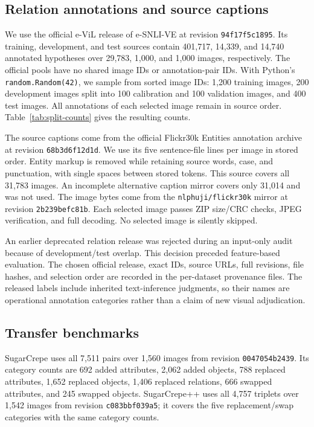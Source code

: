 \subsection{Relation annotations and source captions}
We use the official e-ViL release of e-SNLI-VE at revision \texttt{94f17f5c1895}. Its training, development, and test sources contain 401,717, 14,339, and 14,740 annotated hypotheses over 29,783, 1,000, and 1,000 images, respectively. The official pools have no shared image IDs or annotation-pair IDs. With Python's \texttt{random.Random(42)}, we sample from sorted image IDs: 1,200 training images, 200 development images split into 100 calibration and 100 validation images, and 400 test images. All annotations of each selected image remain in source order. Table~\ref{tab:split-counts} gives the resulting counts.



The source captions come from the official Flickr30k Entities annotation archive at revision \texttt{68b3d6f12d1d}. We use its five sentence-file lines per image in stored order. Entity markup is removed while retaining source words, case, and punctuation, with single spaces between stored tokens. This source covers all 31,783 images. An incomplete alternative caption mirror covers only 31,014 and was not used. The image bytes come from the \texttt{nlphuji/flickr30k} mirror at revision \texttt{2b239befc81b}. Each selected image passes ZIP size/CRC checks, JPEG verification, and full decoding. No selected image is silently skipped.

An earlier deprecated relation release was rejected during an input-only audit because of development/test overlap. This decision preceded feature-based evaluation. The chosen official release, exact IDs, source URLs, full revisions, file hashes, and selection order are recorded in the per-dataset provenance files. The released labels include inherited text-inference judgments, so their names are operational annotation categories rather than a claim of new visual adjudication.

\subsection{Transfer benchmarks}
SugarCrepe uses all 7,511 pairs over 1,560 images from revision \texttt{0047054b2439}. Its category counts are 692 added attributes, 2,062 added objects, 788 replaced attributes, 1,652 replaced objects, 1,406 replaced relations, 666 swapped attributes, and 245 swapped objects. SugarCrepe++ uses all 4,757 triplets over 1,542 images from revision \texttt{c083bbf039a5}; it covers the five replacement/swap categories with the same category counts.

